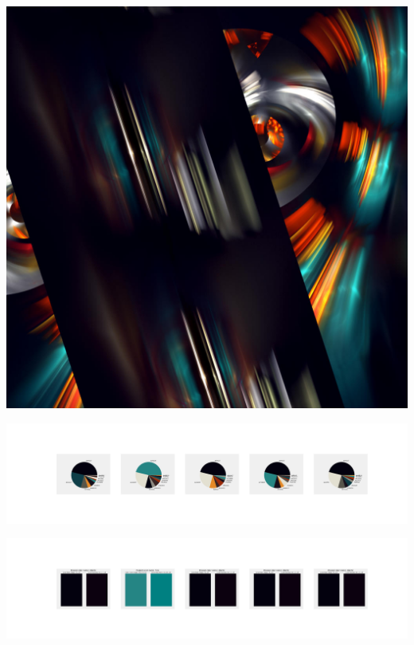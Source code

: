 \documentclass[11pt]{article}
\begin{document}
\begin{landscape}
    \begin{center}
    \includegraphics[width=\textwidth]{./nbimg/file (329).jpg}
    \end{center}

    \begin{center}
    \includegraphics[width=250mm]{./nbimg/pie-255.jpg}
    \end{center}

    \begin{center}
    \includegraphics[width=250mm]{./nbimg/peak-255.jpg}
    \end{center}
    


\end{landscape}
\end{document}
